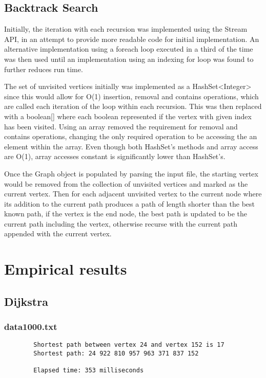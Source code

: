 \documentclass{article}
\begin{document}
    \subsection*{Backtrack Search}

    Initially, the iteration with each recursion was implemented using the Stream API, in an attempt to provide more
    readable code for initial implementation.
    An alternative implementation using a foreach loop executed in a third of the time was then used until an
    implementation using an indexing for loop was found to further reduces run time.

    The set of unvisited vertices initially was implemented as a HashSet<Integer> since this would allow for O(1)
    insertion, removal and contains operations, which are called each iteration of the loop within each recursion.
    This was then replaced with a boolean[] where each boolean represented if the vertex with given index has been
    visited.
    Using an array removed the requirement for removal and contains operations, changing the only required operation to
    be accessing the an element within the array.
    Even though both HashSet's methods and array access are O(1), array accesses constant is significantly lower than
    HashSet's.

    Once the Graph object is populated by parsing the input file, the starting vertex would be removed from the collection
    of unvisited vertices and marked as the current vertex.
    Then for each adjacent unvisited vertex to the current node where its addition to the current path produces a path of
    length shorter than the best known path, if the vertex is the end node, the best path is updated to be the current path
    including the vertex, otherwise recurse with the current path appended with the current vertex.

    \section*{Empirical results}

    \subsection*{Dijkstra}
    \subsubsection*{data1000.txt}
    \begin{verbatim}
        Shortest path between vertex 24 and vertex 152 is 17
        Shortest path: 24 922 810 957 963 371 837 152

        Elapsed time: 353 milliseconds
    \end{verbatim}
\end{document}
